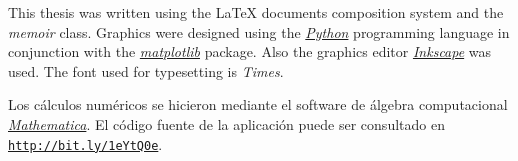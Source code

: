 \pagestyle{empty}


\begin{vplace}[0.5]
    \centering
    \parbox[c]{0.5\linewidth}{
        This thesis was written using the {\LaTeX} documents composition system and the
        \emph{memoir} class. Graphics were designed using the
        \href{https://www.python.org/}{\emph{Python}} programming language in conjunction with the
        \href{http://matplotlib.org/}{\emph{matplotlib}} \nocite{Hunter:2007} package. Also the
        graphics editor \href{http://www.inkscape.org/es/}{\emph{Inkscape}} was used. The font
        used for typesetting is \emph{Times}.

        Los cálculos numéricos se hicieron mediante el software de álgebra
        computacional \href{http://www.wolfram.com/mathematica/}{\emph{Mathematica}}. El código fuente de la
        aplicación puede ser consultado en \texttt{\url{http://bit.ly/1eYtQ0e}}.
    }
\end{vplace}


